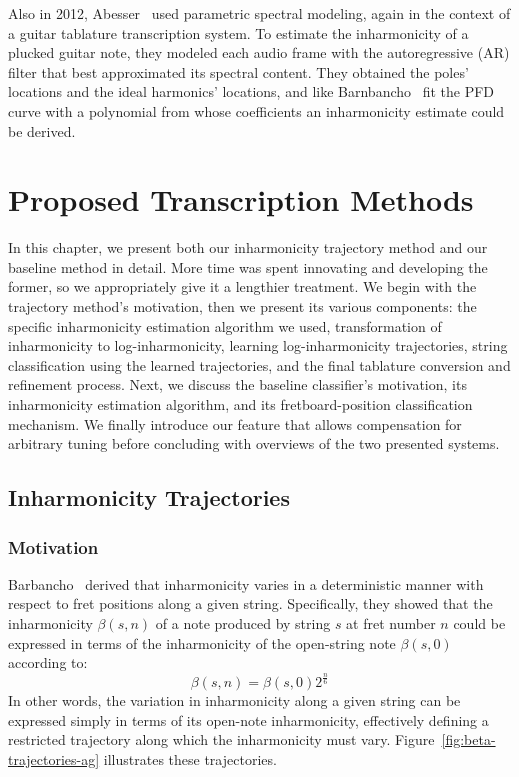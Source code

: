 \documentclass[12pt]{cmuthesis}
\begin{document}
Also in 2012, Abesser~\cite{abesser2012} used parametric spectral modeling, again in the context of a guitar tablature transcription system. To estimate the inharmonicity of a plucked guitar note, they modeled each audio frame with the autoregressive (AR) filter that best approximated its spectral content. They obtained the poles' locations and the ideal harmonics' locations, and like Barnbancho~\cite{barbanchoi2012} fit the PFD curve with a polynomial from whose coefficients an inharmonicity estimate could be derived.



\noindent
\chapter{Proposed Transcription Methods}
\label{chap:method}
In this chapter, we present both our inharmonicity trajectory method and our baseline method in detail. More time was spent innovating and developing the former, so we appropriately give it a lengthier treatment. We begin with the trajectory method's motivation, then we present its various components: the specific inharmonicity estimation algorithm we used, transformation of inharmonicity to log-inharmonicity, learning log-inharmonicity trajectories, string classification using the learned trajectories, and the final tablature conversion and refinement process. Next, we discuss the baseline classifier's motivation, its inharmonicity estimation algorithm, and its fretboard-position classification mechanism. We finally introduce our feature that allows compensation for arbitrary tuning before concluding with overviews of the two presented systems.

\section{Inharmonicity Trajectories}
\subsection{Motivation}
Barbancho~\cite{barbanchoi2012} derived that inharmonicity varies in a deterministic manner with respect to fret positions along a given string. Specifically, they showed that the inharmonicity $\beta(s,n)$ of a note produced by string $s$ at fret number $n$ could be expressed in terms of the inharmonicity of the open-string note $\beta(s,0)$ according to:
\begin{equation} 
\label{eq:beta-traj}
\beta(s,n) = \beta(s,0)2^{\frac{n}{6}}
\end{equation}
In other words, the variation in inharmonicity along a given string can be expressed simply in terms of its open-note inharmonicity, effectively defining a restricted trajectory along which the inharmonicity must vary. Figure~\ref{fig:beta-trajectories-ag} illustrates these trajectories.
\end{document}
